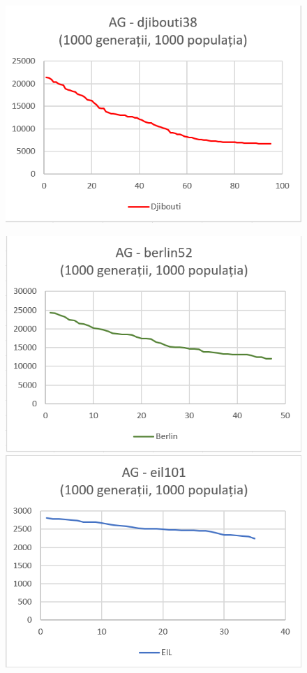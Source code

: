 \documentclass[paper=a4, fontsize=11pt]{scrartcl}
\begin{document}
\begin{figure}[h!]
\begin{center}
    \includegraphics[scale=1]{Grafic_djibouti.png}
\end{center}
\end{figure}

\vspace{-17.8mm}
\begin{figure}[h!]
    \begin{center}
        \includegraphics[scale=1]{Grafic_berlin.png}
        \vspace{200mm}
        \includegraphics[scale=1]{Grafic_eil.png}
\end{center}
\end{figure}
\end{document}
